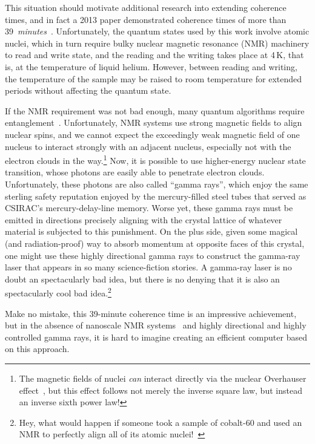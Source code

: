This situation should motivate additional research into extending
coherence times, and in fact a 2013 paper demonstrated coherence
times of more than
39~\emph{minutes}~\cite{KamyarSaeedi2018QC-39-minutes}.
Unfortunately, the quantum states used by this work involve atomic nuclei,
which in turn require bulky nuclear magnetic resonance (NMR) machinery
to read and write state, and the reading and the writing takes place
at 4\,K, that is, at the temperature of liquid helium.
However, between reading and writing, the temperature of the sample may
be raised to room temperature for extended periods without affecting
the quantum state.

If the NMR requirement was not bad enough, many quantum algorithms require
entanglement~\cite{PeterWSchor2001QuantumAlgorithms}.
Unfortunately, NMR systems use strong magnetic fields to align
nuclear spins, and we cannot expect the exceedingly weak magnetic
field of one nucleus to interact strongly with an adjacent nucleus,
especially not with the electron clouds in the way.\footnote{
	The magnetic fields of nuclei \emph{can} interact directly
	via the nuclear Overhauser effect~\cite{PhysRev.92.411},
	but this effect follows not merely the inverse square law,
	but instead an inverse sixth power law!}
Now, it is possible to use higher-energy nuclear state transition,
whose photons are easily able to penetrate electron clouds.
Unfortunately, these photons are also called ``gamma rays'', which enjoy
the same sterling safety reputation enjoyed by the mercury-filled steel
tubes that served as CSIRAC's mercury-delay-line memory.
Worse yet, these gamma rays must be emitted in directions precisely
aligning with the crystal lattice of whatever material is subjected
to this punishment.
On the plus side, given some magical (and radiation-proof) way to absorb
momentum at opposite faces of this crystal, one might use these highly
directional gamma rays to construct the gamma-ray laser that appears in
so many science-fiction stories.
A gamma-ray laser is no doubt an spectacularly bad idea, but there is no
denying that it is also an spectacularly cool bad idea.\footnote{
	Hey, what would happen if someone took a sample of
	cobalt-60 and used an NMR to perfectly align all of its
	atomic nuclei!~\cite{1957PhRv..105.1413W}}

Make no mistake, this 39-minute coherence time is an impressive
achievement, but in the absence
of nanoscale NMR systems~\cite{HJMamin2013QC-nanoscale-NMR} and
highly directional and highly controlled gamma rays, it is
hard to imagine creating an efficient computer based on this approach.

